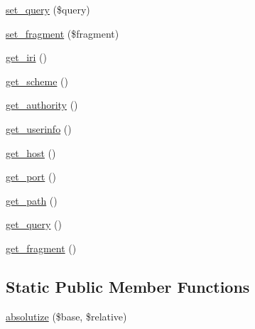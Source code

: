 \begin{DoxyCompactItemize}
\hyperlink{class_simple_pie___i_r_i_a0d64f4cbc7b1af1e38f7d30c687908a6}{set\-\_\-query} (\$query)
\item 
\hyperlink{class_simple_pie___i_r_i_ad4676812a304fd240553f81c5a59ce29}{set\-\_\-fragment} (\$fragment)
\item 
\hyperlink{class_simple_pie___i_r_i_a4b57b3cf890c2bcd4ca2929a68303ec4}{get\-\_\-iri} ()
\item 
\hyperlink{class_simple_pie___i_r_i_a33526618976337cc871a58a11d65999c}{get\-\_\-scheme} ()
\item 
\hyperlink{class_simple_pie___i_r_i_a8b9083a5f45cf8aaba7ee7c97d368883}{get\-\_\-authority} ()
\item 
\hyperlink{class_simple_pie___i_r_i_a787869f0527a83ddc443afd8d352cff8}{get\-\_\-userinfo} ()
\item 
\hyperlink{class_simple_pie___i_r_i_ad74e68aeee196aa558585bd8fc8b64a8}{get\-\_\-host} ()
\item 
\hyperlink{class_simple_pie___i_r_i_aedff37206b41e56f2fd94fc8f269ea5a}{get\-\_\-port} ()
\item 
\hyperlink{class_simple_pie___i_r_i_a31517cd256d6bf00041e62d32bebebc6}{get\-\_\-path} ()
\item 
\hyperlink{class_simple_pie___i_r_i_a5ce7f5a6701cf6120a6d185da436cd44}{get\-\_\-query} ()
\item 
\hyperlink{class_simple_pie___i_r_i_a703e8619ad454c2041c1547201e90f45}{get\-\_\-fragment} ()
\end{DoxyCompactItemize}
\subsection*{Static Public Member Functions}
\begin{DoxyCompactItemize}
\item 
\hyperlink{class_simple_pie___i_r_i_a92acb9e62374d0b1008f0bf5cb7a1063}{absolutize} (\$base, \$relative)
\end{DoxyCompactItemize}
